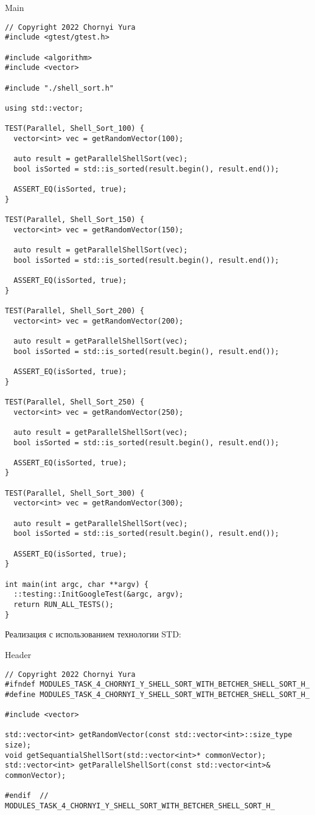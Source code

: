 \documentclass{report}
\begin{document}
\begin{center}
Main
\end{center}
\begin{lstlisting}
// Copyright 2022 Chornyi Yura
#include <gtest/gtest.h>

#include <algorithm>
#include <vector>

#include "./shell_sort.h"

using std::vector;

TEST(Parallel, Shell_Sort_100) {
  vector<int> vec = getRandomVector(100);

  auto result = getParallelShellSort(vec);
  bool isSorted = std::is_sorted(result.begin(), result.end());

  ASSERT_EQ(isSorted, true);
}

TEST(Parallel, Shell_Sort_150) {
  vector<int> vec = getRandomVector(150);

  auto result = getParallelShellSort(vec);
  bool isSorted = std::is_sorted(result.begin(), result.end());

  ASSERT_EQ(isSorted, true);
}

TEST(Parallel, Shell_Sort_200) {
  vector<int> vec = getRandomVector(200);

  auto result = getParallelShellSort(vec);
  bool isSorted = std::is_sorted(result.begin(), result.end());

  ASSERT_EQ(isSorted, true);
}

TEST(Parallel, Shell_Sort_250) {
  vector<int> vec = getRandomVector(250);

  auto result = getParallelShellSort(vec);
  bool isSorted = std::is_sorted(result.begin(), result.end());

  ASSERT_EQ(isSorted, true);
}

TEST(Parallel, Shell_Sort_300) {
  vector<int> vec = getRandomVector(300);

  auto result = getParallelShellSort(vec);
  bool isSorted = std::is_sorted(result.begin(), result.end());

  ASSERT_EQ(isSorted, true);
}

int main(int argc, char **argv) {
  ::testing::InitGoogleTest(&argc, argv);
  return RUN_ALL_TESTS();
}
\end{lstlisting}

\newpage

\par Реализация с использованием технологии STD:
\begin{center}
Header
\end{center}
\begin{lstlisting}
// Copyright 2022 Chornyi Yura
#ifndef MODULES_TASK_4_CHORNYI_Y_SHELL_SORT_WITH_BETCHER_SHELL_SORT_H_
#define MODULES_TASK_4_CHORNYI_Y_SHELL_SORT_WITH_BETCHER_SHELL_SORT_H_

#include <vector>

std::vector<int> getRandomVector(const std::vector<int>::size_type size);
void getSequantialShellSort(std::vector<int>* commonVector);
std::vector<int> getParallelShellSort(const std::vector<int>& commonVector);

#endif  // MODULES_TASK_4_CHORNYI_Y_SHELL_SORT_WITH_BETCHER_SHELL_SORT_H_
\end{lstlisting}
\end{document}
